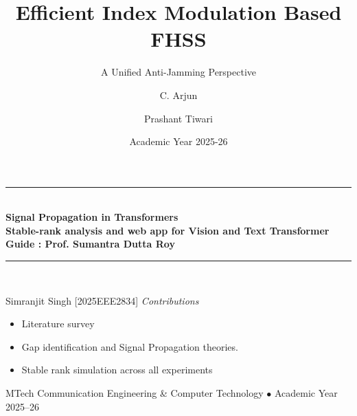 \documentclass[aspectratio=169,10pt]{beamer}
\title[Efficient IM-FHSS]{Efficient Index Modulation Based FHSS}
\subtitle{A Unified Anti-Jamming Perspective}
\author[C. Arjun \& P. Tiwari]{C. Arjun \and Prashant Tiwari}
\institute[]{Based on Shi \textit{et al.}, IEEE TVT}
\date{Academic Year 2025-26}
\begin{document}
\begin{frame}[plain]
\vfill
\begin{center}
{\color{PrimaryBlue}\rule{0.9\textwidth}{1.2pt}}\\[10pt]
{\LARGE\bfseries\color{PrimaryBlue} Signal Propagation in Transformers }\\[4pt]
{\Large\bfseries\color{PrimaryBlue} Stable-rank analysis and web app for Vision and Text Transformer}\\[8pt]
{\Large\bfseries\color{PrimaryRed} Guide : Prof. Sumantra Dutta Roy}\\[8pt]

{\color{PrimaryBlue}\rule{0.9\textwidth}{1.2pt}}\\[14pt]
\end{center}


\begin{block}{\small Simranjit Singh [2025EEE2834]}
\scriptsize
\textit{Contributions}
\begin{itemize}\setlength\itemsep{2pt}\setlength\topsep{2pt}
  \item Literature survey
  \item Gap identification and Signal Propagation theories. 
  \item Stable rank simulation across all experiments
\end{itemize}
\end{block}


\vspace{6pt}
\begin{center}
{\small\color{DarkText!70} MTech Communication Engineering \& Computer Technology \quad $\bullet$ \quad Academic Year 2025--26}
\end{center}
\vfill
\end{frame}
\end{document}
